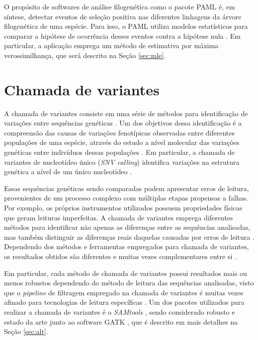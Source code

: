 \documentclass[cic,tc]{iiufrgs}
\begin{document}
O propósito de softwares de análise filogenética como o pacote PAML é, em
síntese, detectar eventos de seleção positiva nas diferentes linhagens da
árvore filogenética de uma espécie. Para isso, o PAML utiliza modelos
estatísticos para comparar a hipótese de ocorrência desses eventos contra a
hipótese nula \cite{moretti2012gcodeml}. Em particular, a aplicação emprega um
método de estimativa por máxima verossimilhança, que será descrito na Seção
\ref{sec:mle}.

\section{Chamada de variantes}
\label{sec:call}

A chamada de variantes consiste em uma série de métodos para identificação de
variações entre sequências genéticas \cite{nielsen2011genotype}. Um dos
objetivos dessa identificação é a compreensão das causas de variações
fenotípicas observadas entre diferentes populações de uma espécie, através do
estudo a nível molecular das variações genéticas entre indivíduos dessas
populações \cite{jiang2019population}. Em particular, a chamada de variantes de
nucleotídeo único (\textit{SNV calling}) identifica variações na estrutura
genética a nível de um único nucleotídeo \cite{khurana2016role}.

Essas sequências genéticas sendo comparadas podem apresentar erros de leitura,
provenientes de um processo complexo com múltiplas etapas propensas a falhas.
Por exemplo, os próprios instrumentos utilizados possuem propriedades físicas
que geram leituras imperfeitas. A chamada de variantes emprega diferentes
métodos para identificar não apenas as diferenças entre as sequências
analisadas, mas também distinguir as diferenças reais daquelas causadas por
erros de leitura \cite{poplin2018universal}. Dependendo dos métodos e
ferramentas empregados para chamada de variantes, os resultados obtidos são
diferentes e muitas vezes complementares entre
si \cite{hwang2015systematic} \cite{gezsi2015variantmetacaller} \cite{guo2015seqmule}.

Em particular, cada método de chamada de variantes possui resultados mais ou
menos robustos dependendo do método de leitura das sequências analisadas, visto
que o \textit{pipeline} de filtragem empregado na chamada de variantes é muitas vezes
afinado para tecnologias de leitura específicas \cite{poplin2018universal}. Um
dos pacotes utilizados para realizar a chamada de variantes é o
\textit{SAMtools} \cite{pirooznia2014validation}, sendo considerado robusto e estado da
arte junto ao software
GATK \cite{crysnanto2019accurate} \cite{hwang2015systematic}
\cite{yao2020evaluation} \cite{poplin2018universal}, que é descrito em mais
detalhes na Seção \ref{sec:alt}.
\end{document}
